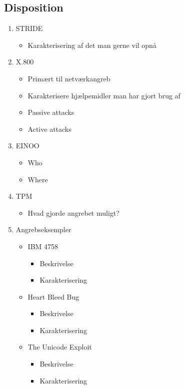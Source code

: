 \documentclass[a4, english]{article}
\begin{document}
\subsection{Disposition}
\begin{enumerate}
	\item STRIDE
  \begin{itemize}
  	\item Karakterisering af det man gerne vil opnå
  \end{itemize}
  \item X.800
  \begin{itemize}
  	\item Primært til netværkangreb
    \item Karakterisere hjælpemidler man har gjort brug af
    \item Passive attacks
    \item Active attacks
  \end{itemize}
  \item EINOO
  \begin{itemize}
  	\item Who
    \item Where
  \end{itemize}
  \item TPM
  \begin{itemize}
  	\item Hvad gjorde angrebet muligt?
  \end{itemize}
  \item Angrebseksempler
  \begin{itemize}
    \item IBM 4758
    \begin{itemize}
    	\item Beskrivelse
      \item Karakterisering
    \end{itemize}
  	\item Heart Bleed Bug
    \begin{itemize}
    	\item Beskrivelse
      \item Karakterisering
    \end{itemize}
    \item The Unicode Exploit
    \begin{itemize}
    	\item Beskrivelse
      \item Karakterisering
    \end{itemize}
  \end{itemize}
\end{enumerate}
\end{document}
